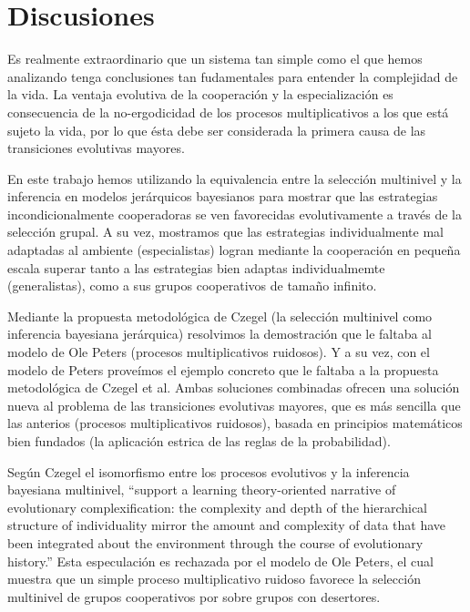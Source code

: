 \documentclass[a4paper,10pt]{article}
\begin{document}
{\section{Discusiones}

Es realmente extraordinario que un sistema tan simple como el que hemos analizando tenga conclusiones tan fudamentales para entender la complejidad de la vida.
La ventaja evolutiva de la cooperación y la especialización es consecuencia de la no-ergodicidad de los procesos multiplicativos a los que está sujeto la vida, por lo que ésta debe ser considerada la primera causa de las transiciones evolutivas mayores.

En este trabajo hemos utilizando la equivalencia entre la selección multinivel y la inferencia en modelos jerárquicos bayesianos para mostrar que las estrategias incondicionalmente cooperadoras se ven favorecidas evolutivamente a través de la selección grupal.
A su vez, mostramos que las estrategias individualmente mal adaptadas al ambiente (especialistas) logran mediante la cooperación en pequeña escala superar tanto a las estrategias bien adaptas individualmemte (generalistas), como a sus grupos cooperativos de tamaño infinito.

Mediante la propuesta metodológica de Czegel \cite{czegel2019-bayesianEvolution} (la selección multinivel como inferencia bayesiana jerárquica) resolvimos la demostración que le faltaba al modelo de Ole Peters (procesos multiplicativos ruidosos).
Y a su vez, con el modelo de Peters proveímos el ejemplo concreto que le faltaba a la propuesta metodológica de Czegel et al.
Ambas soluciones combinadas ofrecen una solución nueva al problema de las transiciones evolutivas mayores, que es más sencilla que las anterios (procesos multiplicativos ruidosos), basada en principios matemáticos bien fundados (la aplicación estrica de las reglas de la probabilidad).

Según Czegel \cite{czegel2019-bayesianEvolution} el isomorfismo entre los procesos evolutivos y la inferencia bayesiana multinivel,  ``support a learning theory-oriented narrative of evolutionary complexification: the complexity and depth of the hierarchical structure of individuality mirror the amount and complexity of data that have been integrated about the environment through the course of evolutionary history.''
Esta especulación es rechazada por el modelo de Ole Peters, el cual muestra que un simple proceso multiplicativo ruidoso favorece la selección multinivel de grupos cooperativos por sobre grupos con desertores.

}
\end{document}
